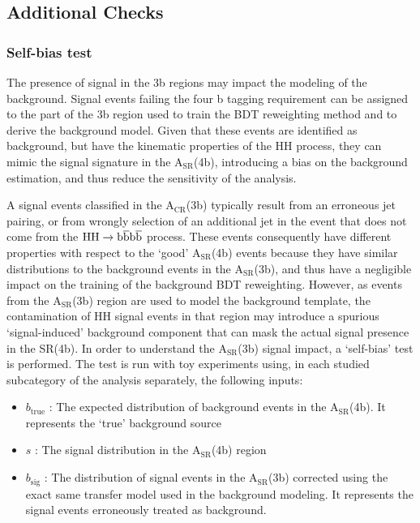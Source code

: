 \clearpage
\subsection{Additional Checks} \label{sec:additionalchecks}
\subsubsection{Self-bias test}

The presence of signal in the 3b regions may impact the modeling of the background. Signal events failing the four b tagging requirement can be assigned to the part of the 3b region used to train the BDT reweighting method and to derive the background model. Given that these events are identified as background, but have the kinematic properties of the HH process, they can mimic the signal signature in the $\mathrm{A_{SR}}$(4b), introducing a bias on the background estimation, and thus reduce the sensitivity of the analysis. 

A signal events classified in the $\mathrm{A_{CR}}$(3b) typically result from an erroneous jet pairing, or from wrongly selection of an additional jet in the event that does not come from the $\mathrm{HH\rightarrow b\overline{b}b\overline{b} }$ process. These events consequently have different properties with respect to the `good' $\mathrm{A_{SR}}$(4b) events because they have similar distributions to the background events in the $\mathrm{A_{SR}}$(3b), and thus have a negligible impact on the training of the background BDT reweighting. However, as events from the $\mathrm{A_{SR}}$(3b) region are used to model the background template, the contamination of HH signal events in that region may introduce a spurious `signal-induced' background component that can mask the actual signal presence in the SR(4b). In order to understand the $\mathrm{A_{SR}}$(3b) signal impact, a `self-bias' test is performed. The test is run with toy experiments using, in each studied subcategory of the analysis separately, the following inputs:
\begin{itemize}
    \item $b_\text{true}$ : The expected distribution of background events in the $\mathrm{A_{SR}}$(4b). It represents the `true' background source
    \item $s$ : The signal distribution in the $\mathrm{A_{SR}}$(4b) region
    \item $b_\text{sig}$ : The distribution of signal events in the $\mathrm{A_{SR}}$(3b) corrected using the exact same transfer model used in the background modeling. It represents the signal events erroneously treated as background.
\end{itemize}

